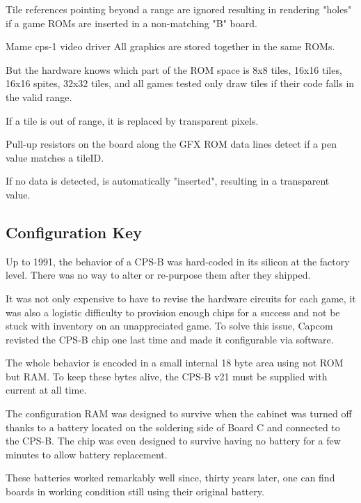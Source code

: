 Tile references pointing beyond a range are ignored resulting in rendering "holes" if a game ROMs are inserted in a non-matching "B" board.

\begin{q}{Mame cps-1 video driver}
All graphics are
stored together in the same ROMs.

But the hardware knows which part of the ROM space
is 8x8 tiles, 16x16 tiles, 16x16 spites, 32x32 tiles, and all games tested only
draw tiles if their code falls in the valid range. 

If a tile is out of range, it is replaced by transparent pixels.
\end{q}

\begin{trivia}
Pull-up resistors on the board along the GFX ROM data lines detect if a pen value matches a tileID. 

If no data is detected,  is automatically "inserted", resulting in a transparent value.
\end{trivia}



\subsection{Configuration Key}
Up to 1991, the behavior of a CPS-B was hard-coded in its silicon at the factory level. There was no way to alter or re-purpose them after they shipped. 

It was not only expensive to have to revise the hardware circuits for each game, it was also a logistic difficulty to provision enough chips for a success and not be stuck with inventory on an unappreciated game. To solve this issue, Capcom revisted the CPS-B chip one last time and made it configurable via software.

The whole behavior is encoded in a small internal 18 byte area using not ROM but RAM. To keep these bytes alive, the CPS-B v21 must be supplied with current at all time\cite{petitSecurity}.

The configuration RAM was designed to survive when the cabinet was turned off thanks to a battery located  on the soldering side of Board C and connected to the CPS-B. The chip was even designed to survive having no battery for a few minutes to allow battery replacement.

\begin{trivia}
These batteries worked remarkably well since, thirty years later, one can find boards in working condition still using their original battery.
\end{trivia}

